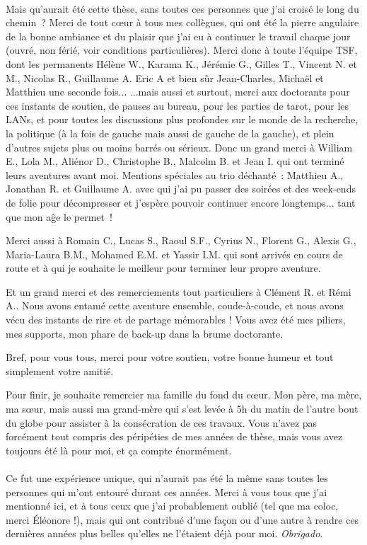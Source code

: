 \documentclass[french, a4paper, 11pt, twoside, pdftex]{StyleThese}
\begin{document}
{\paragraph*{}
	Mais qu'aurait été cette thèse, sans toutes ces personnes que j'ai croisé le long du chemin~?
	Merci de tout cœur à tous mes  collègues, qui ont été la pierre angulaire de la bonne ambiance et du plaisir que j'ai eu à continuer le travail chaque jour \small{(ouvré, non férié, voir conditions particulières)}. Merci donc à toute l'équipe TSF, dont les permanents Hélène W., Karama K., Jérémie G., Gilles T., Vincent N. et M., Nicolas R., Guillaume A. Eric A et bien sûr Jean-Charles, Michaël et Matthieu une seconde fois... 
	\break
	...mais aussi et surtout, merci aux doctorants pour ces instants de soutien, de pauses au bureau, pour les parties de tarot, pour les LANs, et pour toutes les discussions plus profondes sur le monde de la recherche, la politique (à la fois de gauche mais aussi de gauche de la gauche), et plein d'autres sujets plus ou moins barrés ou sérieux. Donc un grand merci à William E., Lola M., Aliénor D., Christophe B., Malcolm B. et Jean I. qui ont terminé leurs aventures avant moi. 
	Mentions spéciales au trio déchanté~: Matthieu A., Jonathan R. et Guillaume A. avec qui j'ai pu passer des soirées et des week-ends de folie pour décompresser et j'espère pouvoir continuer encore longtemps... tant que mon aĝe le permet~!
		
	Merci aussi à Romain C., Lucas S., Raoul S.F., Cyrius N., Florent G., Alexis G., Maria-Laura B.M., Mohamed E.M. et Yassir I.M. qui sont arrivés en cours de route et à qui je souhaite le meilleur pour terminer leur propre aventure. 
	
	Et un grand merci et des remerciements tout particuliers à Clément R. et Rémi A.. Nous avons entamé cette aventure ensemble, coude-à-coude, et nous avons vécu des instants de rire et de partage mémorables ! Vous avez été mes piliers, mes supports, mon phare de back-up dans la brume doctorante. 
	
	Bref, pour vous tous, merci pour votre soutien, votre bonne humeur et tout simplement votre amitié.
	
	Pour finir, je souhaite remercier ma famille du fond du cœur. Mon père, ma mère, ma sœur, mais aussi ma grand-mère qui s'est levée à 5h du matin de l'autre bout du globe pour assister à la consécration de ces travaux. Vous n'avez pas forcément tout compris des péripéties de mes années de thèse, mais vous avez toujours été là pour moi, et ça compte énormément. 
	
\paragraph*{}
	Ce fut une expérience unique, qui n'aurait pas été la même sans toutes les personnes qui m'ont entouré durant ces années. Merci à vous tous que j'ai mentionné ici, et à tous ceux que j'ai probablement oublié (tel que ma coloc, merci Éléonore !), mais qui ont contribué d'une façon ou d'une autre à rendre ces dernières années plus belles qu'elles ne l'étaient déjà pour moi. \textit{Obrigado}.
	

}
\end{document}
